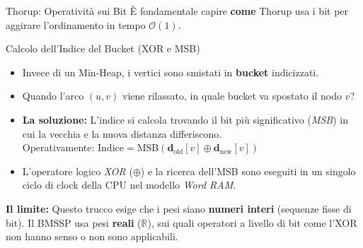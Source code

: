 \documentclass[aspectratio=169]{beamer}
\begin{document}
\begin{frame}{Thorup: Operatività sui Bit}
    È fondamentale capire \textbf{come} Thorup usa i bit per aggirare l'ordinamento in tempo $\mathcal{O}(1)$.
    \vspace{0.1cm}
    
    \begin{block}{Calcolo dell'Indice del Bucket (XOR e MSB)}
        \small
        \begin{itemize}
            \setlength{\itemsep}{0.1cm} 
            \item Invece di un Min-Heap, i vertici sono smistati in \textbf{bucket} indicizzati.
            \item Quando l'arco $(u,v)$ viene rilassato, in quale bucket va spostato il nodo $v$?
            \item \textbf{La soluzione:} L'indice si calcola trovando il bit più significativo (\textit{MSB}) in cui la vecchia e la nuova distanza differiscono. \\
            Operativamente: \textbf{$\text{Indice} = \text{MSB}(\mathbf{d}_{\text{old}}[v] \oplus \mathbf{d}_{\text{new}}[v])$}
            \item L'operatore logico \textit{XOR} ($\oplus$) e la ricerca dell'MSB sono eseguiti in un singolo ciclo di clock della CPU nel modello \textit{Word RAM}.
        \end{itemize}
    \end{block}
    
    \vspace{0.1cm}
    \footnotesize \textbf{Il limite:} Questo trucco esige che i pesi siano \textbf{numeri interi} (sequenze fisse di bit). Il BMSSP usa pesi \textbf{reali} ($\mathbb{R}$), sui quali operatori a livello di bit come l'XOR non hanno senso o non sono applicabili.
\end{frame}
\end{document}
